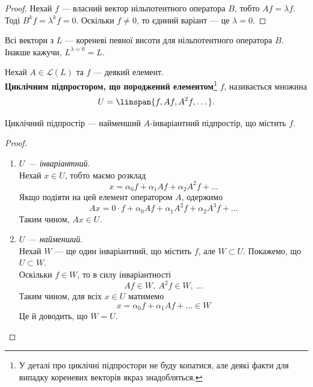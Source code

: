 \documentclass{math_library}
\begin{document}
\begin{proof}
Нехай $f$ --- власний вектор нільпотентного оператора $B$, тобто $Af = \lambda f$. Тоді $B^k f = \lambda^k f = 0$. Оскільки $f \neq 0$, то єдиний варіант --- це $\lambda = 0$.
\end{proof}

\begin{corollary}
Всі вектори з $L$ --- кореневі певної висоти для нільпотентного оператора $B$. Інакше кажучи, $L^{\lambda =  0} = L$.
\end{corollary}

\begin{definition}
Нехай $A \in \mathcal{L}(L)$ та $f$ --- деякий елемент.\\
\textbf{Циклічним підпростором, що породжений елементом}\footnote{У деталі про циклічні підпростори не буду копатися, але деякі факти для випадку кореневих векторів якраз знадобляться.} $f$, називається множина
\begin{align*}
U = \linspan\{f,Af,A^2f,\dots\}.
\end{align*}
\end{definition}

\begin{proposition}
Циклічний підпростір --- найменший $A$-інваріантний підпростір, що містить $f$.
\end{proposition}

\begin{proof}
\begin{enumerate}[topsep=0pt,wide=0pt,label={\Roman*.}]
\item \textit{$U$ --- інваріантний}.\\
Нехай $x \in U$, тобто маємо розклад
\[
x = \alpha_0 f + \alpha_1 Af + \alpha_2 A^2 f + \dots
\]
Якщо подіяти на цей елемент оператором $A$, одержимо
\[
Ax = 0\cdot f + \alpha_0 Af + \alpha_1 A^2f + \alpha_2 A^3 f + \dots 
\]
Таким чином, $Ax \in U$.

\item \textit{$U$ --- найменший}.\\
Нехай $W$ --- ще один інваріантний, що містить $f$, але $W \subset U$. Покажемо, що $U \subset W$.\\
Оскільки $f \in W$, то в силу інваріантності 
\[
Af \in W,\ A^2f \in W,\ \dots
\]
Таким чином, для всіх $x \in U$ матимемо
\[
x = \alpha_0 f + \alpha_1 Af + \dots \in W
\]
Це й доводить, що $W = U$. \qedhere
\end{enumerate}
\end{proof}
\end{document}
